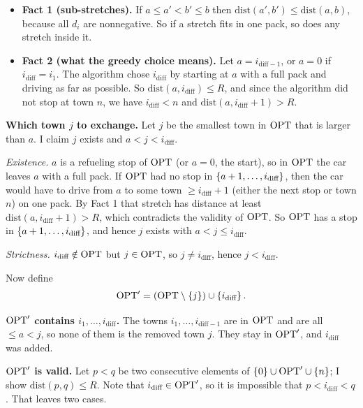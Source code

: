 \documentclass[11pt,addpoints,answers]{exam}
\begin{document}
\begin{questions}
\begin{parts}
\begin{solution}
      \begin{itemize}
        \item \textbf{Fact 1 (sub-stretches).} If $a \le a' < b' \le b$ then $\mathrm{dist}(a',b') \le \mathrm{dist}(a,b)$, because all $d_i$ are nonnegative.
        So if a stretch fits in one pack, so does any stretch inside it.
        \item \textbf{Fact 2 (what the greedy choice means).} Let $a = i_{\text{diff}-1}$, or $a = 0$ if $i_{\text{diff}} = i_1$.
        The algorithm chose $i_{\text{diff}}$ by starting at $a$ with a full pack and driving as far as possible.
        So $\mathrm{dist}(a, i_{\text{diff}}) \le R$, and since the algorithm did not stop at town $n$, we have $i_{\text{diff}} < n$ and $\mathrm{dist}(a, i_{\text{diff}}+1) > R$.
      \end{itemize}

      \textbf{Which town $j$ to exchange.}
      Let $j$ be the smallest town in $\mathrm{OPT}$ that is larger than $a$.
      I claim $j$ exists and $a < j < i_{\text{diff}}$.

      \emph{Existence.} $a$ is a refueling stop of $\mathrm{OPT}$ (or $a=0$, the start), so in $\mathrm{OPT}$ the car leaves $a$ with a full pack.
      If $\mathrm{OPT}$ had no stop in $\left\{a+1,\dots,i_{\text{diff}}\right\}$, then the car would have to drive from $a$ to some town $\ge i_{\text{diff}}+1$ (either the next stop or town $n$) on one pack.
      By Fact 1 that stretch has distance at least $\mathrm{dist}(a,i_{\text{diff}}+1) > R$, which contradicts the validity of $\mathrm{OPT}$.
      So $\mathrm{OPT}$ has a stop in $\left\{a+1,\dots,i_{\text{diff}}\right\}$, and hence $j$ exists with $a < j \le i_{\text{diff}}$.

      \emph{Strictness.} $i_{\text{diff}} \notin \mathrm{OPT}$ but $j \in \mathrm{OPT}$, so $j \ne i_{\text{diff}}$, hence $j < i_{\text{diff}}$.

      Now define
      \[
        \mathrm{OPT}' = (\mathrm{OPT} \setminus \left\{j\right\}) \cup \left\{i_{\text{diff}}\right\} .
      \]

      \textbf{$\mathrm{OPT}'$ contains $i_1,\dots,i_{\text{diff}}$.}
      The towns $i_1,\dots,i_{\text{diff}-1}$ are in $\mathrm{OPT}$ and are all $\le a < j$, so none of them is the removed town $j$.
      They stay in $\mathrm{OPT}'$, and $i_{\text{diff}}$ was added.

      \textbf{$\mathrm{OPT}'$ is valid.}
      Let $p < q$ be two consecutive elements of $\left\{0\right\} \cup \mathrm{OPT}' \cup \left\{n\right\}$; I show $\mathrm{dist}(p,q) \le R$.
      Note that $i_{\text{diff}} \in \mathrm{OPT}'$, so it is impossible that $p < i_{\text{diff}} < q$.
      That leaves two cases.


\end{solution}
\end{parts}
\end{questions}
\end{document}

